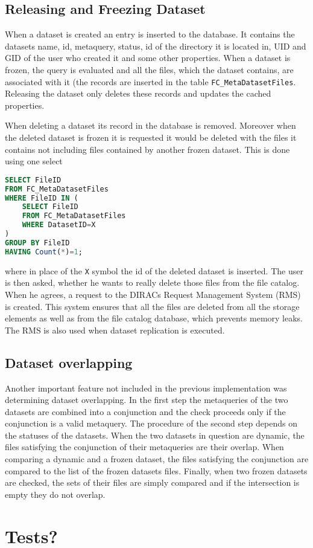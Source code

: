 \subsection{Releasing and Freezing Dataset}

When a dataset is created an entry is inserted to the database. It contains the datasets name, id, metaquery, 
status, id of the directory it is located in, UID and GID of the user who created it and some other 
properties. When a dataset is frozen, the query is evaluated and all the files, which the
dataset contains, are associated with it (the records are inserted in the table \texttt{FC\_MetaDatasetFiles}.
Releasing the dataset only deletes these records and updates the cached properties. 

When deleting a dataset its record in the database is removed. Moreover when the deleted dataset is frozen
it is requested it would be deleted with the files it contains not including files contained by another frozen
dataset. This is done using one select

\begin{lstlisting}[language=sql]
SELECT FileID 
FROM FC_MetaDatasetFiles 
WHERE FileID IN (
	SELECT FileID 
	FROM FC_MetaDatasetFiles 
	WHERE DatasetID=X
) 
GROUP BY FileID 
HAVING Count(*)=1;
\end{lstlisting}

\noindent where in place of the \texttt{X} symbol the id of the deleted dataset is inserted. The user is then 
asked, whether he wants to really delete those files from the file catalog. When he agrees, a request to
the DIRACs Request Management System (RMS) is created. This system ensures that all the files
are deleted from all the storage elements as well as from the file catalog database, 
which prevents memory leaks. The RMS is also used when dataset replication is executed.

\subsection{Dataset overlapping}

Another important feature not included in the previous implementation was determining 
dataset overlapping. In the first step the metaqueries of the two datasets are combined
into a conjunction and the check proceeds only if the conjunction is a valid metaquery.
The procedure of the second step depends on the statuses of the datasets. When the two
datasets in question are dynamic, the files satisfying the conjunction of their metaqueries
are their overlap. When comparing a dynamic and a frozen dataset, the files satisfying 
the conjunction are compared to the list of the frozen datasets files. Finally, when 
two frozen datasets are checked, the sets of their files are simply compared and if 
the intersection is empty they do not overlap.


\section{Tests?}
